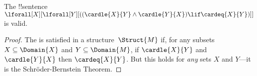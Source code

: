 \documentclass[../../../include/open-logic-section]{subfiles}
\begin{document}
\begin{prop}
The !!{sentence} $\lforall[X][\lforall[Y][((\cardle{X}{Y} \land
    \cardle{Y}{X}) \lif \cardeq{X}{Y})]]$ is valid.
\end{prop}

\begin{proof}
The is satisfied in a structure~$\Struct{M}$ if, for any subsets $X
\subseteq \Domain{X}$ and $Y \subseteq \Domain{M}$, if $\cardle{X}{Y}$
and $\cardle{Y}{X}$ then $\cardeq{X}{Y}$.  But this holds for
\emph{any} sets $X$ and $Y$---it is the Schr\"oder-Bernstein Theorem.
\end{proof}
\end{document}
